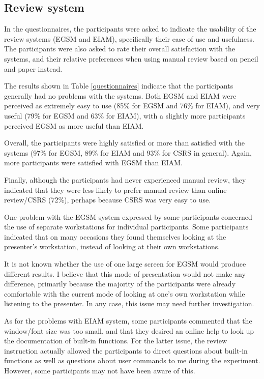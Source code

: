 \subsection {Review system}
In the questionnaires, the participants were asked to indicate the
usability of the review systems (EGSM and EIAM), specifically their
ease of use and usefulness. The participants were also asked to rate
their overall satisfaction with the systems, and their relative
preferences when using manual review based on pencil and paper
instead.  

The results shown in Table \ref{questionnaires} indicate
that the participants generally had no problems with the systems. 
Both EGSM and EIAM were perceived as extremely easy to use (85\%
for EGSM and 76\% for EIAM), and very useful (79\% for EGSM and
63\% for EIAM), with a slightly more participants perceived EGSM as 
more useful than EIAM.

Overall, the participants were highly satisfied or more than satisfied
with the systems  (97\% for EGSM, 89\% for EIAM and 93\% for CSRS in
general). 
Again, more participants were satisfied with EGSM than EIAM.

Finally, although the participants had never experienced manual
review, they indicated that they were less likely to prefer manual
review than online review/CSRS (72\%), perhaps because CSRS 
was very easy to use. 

One problem with the EGSM system expressed by some participants concerned
the use of separate workstations for individual
participants. Some participants indicated that on many occasions they
found themselves looking at the presenter's workstation,  
instead of looking at their own workstations. 

It is not known whether the use of one large screen for
EGSM would produce different results.
I believe that this mode of presentation would not make any
difference, primarily because the majority of the participants were
already comfortable with the current mode of looking at one's
own workstation while listening to the presenter.  
In any case, this issue may need further investigation.

As for the problems with EIAM system, some participants commented
that the window/font size was too small, and that they desired an
online help to look up the documentation of built-in functions.  
For the latter issue, the review instruction actually allowed
the participants to direct questions about built-in functions
as well as questions about user commands to me during the
experiment. 
However, some participants may not have been aware of this.

